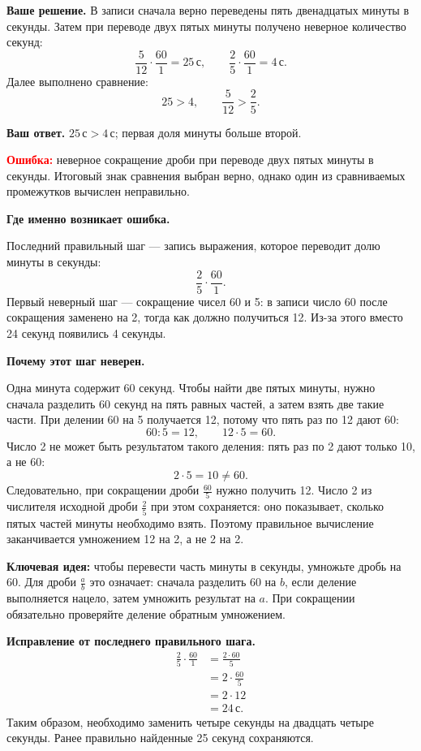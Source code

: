 \documentclass[11pt,a4paper]{article}
\begin{document}
\textbf{Ваше решение.} В записи сначала верно переведены пять двенадцатых минуты в секунды. Затем при переводе двух пятых минуты получено неверное количество секунд:
\[
  \frac{5}{12}\cdot\frac{60}{1}=25\,\text{с},
  \qquad
  \frac25\cdot\frac{60}{1}=4\,\text{с}.
\]
Далее выполнено сравнение:
\[
  25>4,
  \qquad
  \frac{5}{12}>\frac25.
\]

\textbf{Ваш ответ.} $25\,\text{с}>4\,\text{с}$; первая доля минуты больше второй.

\textcolor{red}{\textbf{Ошибка:}} неверное сокращение дроби при переводе двух пятых минуты в секунды. Итоговый знак сравнения выбран верно, однако один из сравниваемых промежутков вычислен неправильно.

\textbf{Где именно возникает ошибка.}

Последний правильный шаг --- запись выражения, которое переводит долю минуты в секунды:
\[
  \frac25\cdot\frac{60}{1}.
\]
Первый неверный шаг --- сокращение чисел 60 и 5: в записи число 60 после сокращения заменено на 2, тогда как должно получиться 12. Из-за этого вместо 24 секунд появились 4 секунды.

\textbf{Почему этот шаг неверен.}

Одна минута содержит 60 секунд. Чтобы найти две пятых минуты, нужно сначала разделить 60 секунд на пять равных частей, а затем взять две такие части. При делении 60 на 5 получается 12, потому что пять раз по 12 дают 60:
\[
  60:5=12,\qquad 12\cdot5=60.
\]
Число 2 не может быть результатом такого деления: пять раз по 2 дают только 10, а не 60:
\[
  2\cdot5=10\ne60.
\]
Следовательно, при сокращении дроби $\frac{60}{5}$ нужно получить 12. Число 2 из числителя исходной дроби $\frac25$ при этом сохраняется: оно показывает, сколько пятых частей минуты необходимо взять. Поэтому правильное вычисление заканчивается умножением 12 на 2, а не 2 на 2.

\textcolor{blue!60!black}{\textbf{Ключевая идея:}} чтобы перевести часть минуты в секунды, умножьте дробь на 60. Для дроби $\frac ab$ это означает: сначала разделить 60 на $b$, если деление выполняется нацело, затем умножить результат на $a$. При сокращении обязательно проверяйте деление обратным умножением.

\textbf{Исправление от последнего правильного шага.}
\[
\begin{aligned}
  \frac25\cdot\frac{60}{1}
  &=\frac{2\cdot60}{5}\\
  &=2\cdot\frac{60}{5}\\
  &=2\cdot12\\
  &=24\,\text{с}.
\end{aligned}
\]
Таким образом, необходимо заменить четыре секунды на двадцать четыре секунды. Ранее правильно найденные 25 секунд сохраняются.
\end{document}
